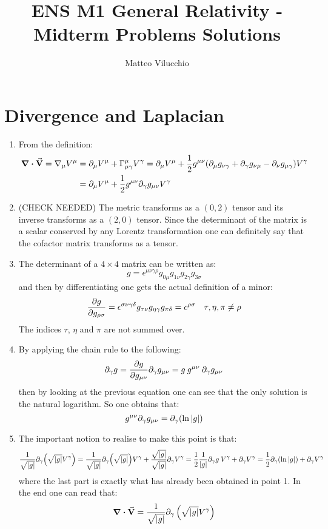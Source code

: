 \documentclass[11pt, oneside]{article}
\title{ENS M1 General Relativity - Midterm Problems Solutions}
\author{Matteo Vilucchio}
\newcommand{\G}{\Gamma}
\begin{document}
\maketitle

\section{Divergence and Laplacian}
\begin{enumerate}
\item From the definition:
\begin{align*}
	\div{\va{V}} = \nabla_\mu V^\mu &= \partial_\mu V^\mu + \G_{\mu\gamma}^\mu V^\gamma = \partial_\mu V^\mu + \frac{1}{2} g^{\mu\nu}\qty( \partial_\mu g_{\nu\gamma} + \partial_\gamma g_{\nu\mu} - \partial_\nu g_{\mu\gamma})V^\gamma \\
	&= \partial_\mu V^\mu + \frac{1}{2} g^{\mu\nu}\partial_\gamma g_{\mu\nu} V^\gamma
\end{align*}

\item (CHECK NEEDED) The metric transforms as a $(0,2)$ tensor and its inverse transforms as a $(2,0)$ tensor. Since the determinant of the matrix is a scalar conserved by any Lorentz transformation one can definitely say that the cofactor matrix transforms as a tensor.

\item The determinant of a $4\times4$ matrix can be written as:
\[
	g = \epsilon^{\mu\nu\gamma\rho} g_{0\mu} g_{1\nu} g_{2\gamma} g_{3\sigma}
\]
and then by differentiating one gets the actual definition of a minor:
\[
	\pdv{g}{g_{\rho\sigma}} = \epsilon^{\sigma\nu\gamma\delta} g_{\tau \nu}g_{\eta \gamma} g_{\pi\delta} = c^{\rho\sigma} \quad \tau, \eta, \pi \neq \rho
\]
The indices $\tau$, $\eta$ and $\pi$ are not summed over.

\item By applying the chain rule to the following:
\[
	\partial_\gamma g = \pdv{g}{g_{\mu\nu}} \partial_\gamma g_{\mu\nu} = g\: g^{\mu\nu}\:\partial_\gamma g_{\mu\nu}
\]
then by looking at the previous equation one can see that the only solution is the natural logarithm. So one obtains that:
\[
	g^{\mu\nu} \partial_\gamma g_{\mu\nu} = \partial_{\gamma}\qty( \ln \abs{g})
\]

\item The important notion to realise to make this point is that:
\[
	\frac{1}{\sqrt{\abs{g}}} \partial_\gamma \qty(\sqrt{\abs{g}}V^\gamma) = \frac{1}{\sqrt{\abs{g}}} \partial_\gamma \qty(\sqrt{\abs{g}}) V^\gamma + \frac{\sqrt{\abs{g}}}{\sqrt{\abs{g}}} \partial_\gamma V^\gamma = \frac{1}{2} \frac{1}{\abs{g}} \partial_\gamma g \: V^\gamma + \partial_\gamma V^\gamma = \frac{1}{2} \partial_{\gamma}\qty( \ln \abs{g}) + \partial_\gamma V^\gamma
\]
where the last part is exactly what has already been obtained in point 1. In the end one can read that:
\[
	\div \va{V}=\frac{1}{\sqrt{|g|}} \partial_{\gamma}\left(\sqrt{|g|} V^{\gamma}\right)
\]


\end{enumerate}
\end{document}
